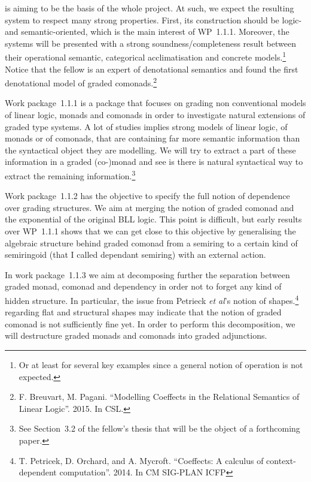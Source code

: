 \documentclass{article}[11pt]
\begin{document}
 is aiming to be the basis of the whole project. At such, we expect the resulting system to respect many strong properties. First, its construction should be logic- and semantic-oriented, which is the main interest of WP~1.1.1. Moreover, the systems will be presented with a strong soundness/completeness result between their operational semantic, categorical acclimatisation and concrete models.\footnote{Or at least for several key examples since a general notion of operation is not expected.} Notice that the fellow is an expert of denotational semantics and found the first denotational model of graded comonads.\footnote{F. Breuvart, M. Pagani. ``Modelling Coeffects in the Relational Semantics of Linear Logic''. 2015. In CSL.}

 Work package~1.1.1 is a package that focuses on grading non conventional models of linear logic, monads and comonads in order to investigate natural extensions of graded type systems. A lot of studies implies strong models of linear logic, of monads or of comonads, that are containing far more semantic information than the syntactical object they are modelling. We will try to extract a part of these information in a graded (co-)monad and see is there is natural syntactical way to extract the remaining information.\footnote{See Section~3.2 of the fellow's thesis that will be the object of a forthcoming paper.}

Work package~1.1.2 has the objective to specify the full notion of dependence over grading structures. We aim at merging the notion of graded comonad and the exponential of the original BLL logic. This point is difficult, but early results over WP~1.1.1 shows that we can get close to this objective by generalising the algebraic structure behind graded comonad from a semiring to a certain kind of semiringoid (that I called dependant semiring) with an external action.

In work package~1.1.3 we aim at decomposing further the separation between graded monad, comonad and dependency in order not to forget any kind of hidden structure. In particular, the issue from Petrieck {\em et al}'s notion of shapes.\footnote{T. Petricek, D. Orchard, and A. Mycroft. ``Coeffects: A calculus of context-dependent computation''. 2014. In CM SIG-PLAN ICFP} regarding flat and structural shapes may indicate that the notion of graded comonad is not sufficiently fine yet. In order to perform this decomposition, we will destructure graded monads and comonads into graded adjunctions.
\end{document}
